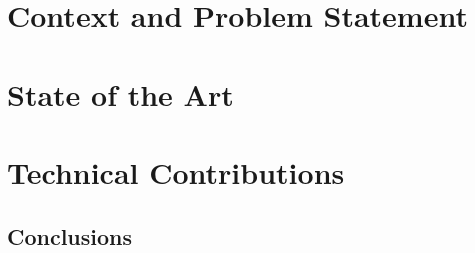 \documentclass[english]{spimubphdthesis}
\begin{document}
 
\frontmatter




	
\tableofcontents

\mainmatter
 
\part{Context and Problem Statement}




\part{State of the Art}

%

\part{Technical Contributions}







\chapter{Conclusions}
\end{document}
